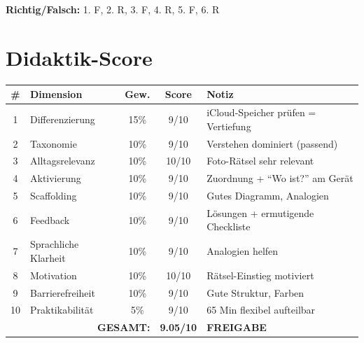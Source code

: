 \documentclass[11pt,a4paper]{article}
\begin{document}
\textbf{Richtig/Falsch:}
1. F, 2. R, 3. F, 4. R, 5. F, 6. R

\section{Didaktik-Score}

\begin{scorebox}
\begin{tabular}{|c|l|c|c|p{3.5cm}|}
\hline
\# & Dimension & Gew. & Score & Notiz \\
\hline
1 & Differenzierung & 15\% & 9/10 & iCloud-Speicher prüfen = Vertiefung \\
2 & Taxonomie & 10\% & 9/10 & Verstehen dominiert (passend) \\
3 & Alltagsrelevanz & 10\% & 10/10 & Foto-Rätsel sehr relevant \\
4 & Aktivierung & 10\% & 9/10 & Zuordnung + ``Wo ist?'' am Gerät \\
5 & Scaffolding & 10\% & 9/10 & Gutes Diagramm, Analogien \\
6 & Feedback & 10\% & 9/10 & Lösungen + ermutigende Checkliste \\
7 & Sprachliche Klarheit & 10\% & 9/10 & Analogien helfen \\
8 & Motivation & 10\% & 10/10 & Rätsel-Einstieg motiviert \\
9 & Barrierefreiheit & 10\% & 9/10 & Gute Struktur, Farben \\
10 & Praktikabilität & 5\% & 9/10 & 65 Min flexibel aufteilbar \\
\hline
\multicolumn{3}{|r|}{\textbf{GESAMT:}} & \textbf{9.05/10} & \textcolor{successgreen}{\textbf{FREIGABE}} \\
\hline
\end{tabular}
\end{scorebox}
\end{document}
